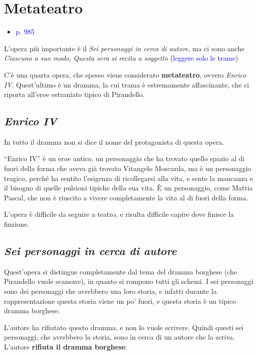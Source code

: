 \documentclass[a4paper, twoside, titlepage]{book}
\newcommand{\elenco}[1]{%
\begin{itemize}
#1
\end{itemize}}
\renewcommand{\emph}[1]{\textcolor{blue}{#1}}
\begin{document}
\section{Metateatro}
\elenco{\item \emph{p. 985}}

L’opera più importante è il \textit{Sei personaggi in cerca di autore}, ma ci sono anche \textit{Ciascuno a suo modo}, \textit{Questa sera si recita a soggetto} (\emph{leggere solo le trame})

C’è una quarta opera, che spesso viene considerato \textbf{metateatro}, ovvero \textit{Enrico IV}.
Quest’ultimo è un dramma, la cui trama è estremamente affascinante, che ci riporta all’eroe estraniato tipico di Pirandello.

\subsection{\textit{Enrico IV}}

In tutto il dramma non si dice il nome del protagonista di questa opera.


“Enrico IV” è un eroe antico, un personaggio che ha trovato quello spazio al di fuori della forma che aveva già trovato Vitangelo Moscarda, ma è un personaggio tragico, perché ha sentito l’esigenza di ricollegarsi alla vita, e sente la mancanza e il bisogno di quelle pulsioni tipiche della sua vita.
È un personaggio, come Mattia Pascal, che non è riuscito a vivere completamente la vita al di fuori della forma.

L’opera è difficile da seguire a teatro, e risulta difficile capire dove finisce la finzione.

\subsection{\textit{Sei personaggi in cerca di autore}}

Quest’opera si distingue completamente dal tema del dramma borghese (che Pirandello vuole scansare), in quanto si rompono tutti gli schemi.
I sei personaggi sono dei personaggi che avrebbero una loro storia, e infatti durante la rappresentazione questa storia viene un po’ fuori, e questa storia è un tipico dramma borghese.

L’autore ha rifiutato questo dramma, e non lo vuole scrivere. Quindi questi sei personaggi, che avrebbero la storia, sono in cerca di un autore che la scriva. L’autore \textbf{rifiuta il dramma borghese}.
\end{document}
